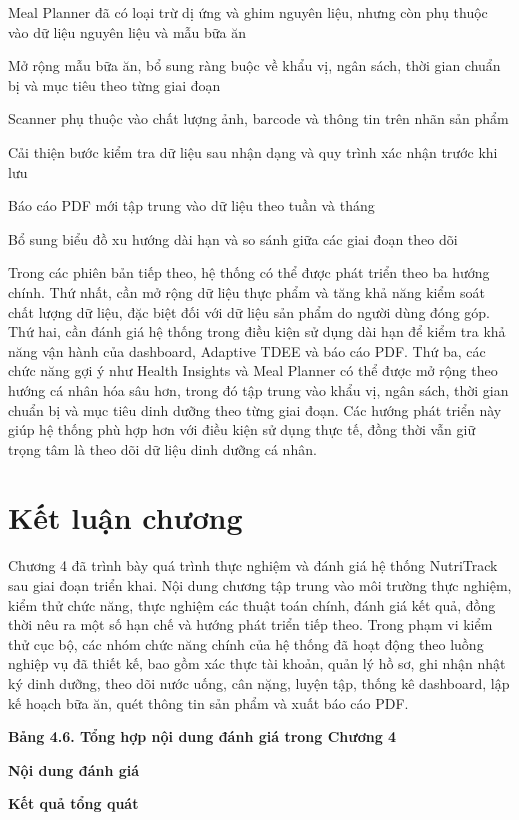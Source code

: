 \documentclass[12pt, a4paper]{report}
\begin{document}
Meal Planner đã có loại trừ dị ứng và ghim nguyên liệu, nhưng còn phụ thuộc vào dữ liệu nguyên liệu và mẫu bữa ăn

Mở rộng mẫu bữa ăn, bổ sung ràng buộc về khẩu vị, ngân sách, thời gian chuẩn bị và mục tiêu theo từng giai đoạn

Scanner phụ thuộc vào chất lượng ảnh, barcode và thông tin trên nhãn sản phẩm

Cải thiện bước kiểm tra dữ liệu sau nhận dạng và quy trình xác nhận trước khi lưu

Báo cáo PDF mới tập trung vào dữ liệu theo tuần và tháng

Bổ sung biểu đồ xu hướng dài hạn và so sánh giữa các giai đoạn theo dõi

Trong các phiên bản tiếp theo, hệ thống có thể được phát triển theo ba hướng chính. Thứ nhất, cần mở rộng dữ liệu thực phẩm và tăng khả năng kiểm soát chất lượng dữ liệu, đặc biệt đối với dữ liệu sản phẩm do người dùng đóng góp. Thứ hai, cần đánh giá hệ thống trong điều kiện sử dụng dài hạn để kiểm tra khả năng vận hành của dashboard, Adaptive TDEE và báo cáo PDF. Thứ ba, các chức năng gợi ý như Health Insights và Meal Planner có thể được mở rộng theo hướng cá nhân hóa sâu hơn, trong đó tập trung vào khẩu vị, ngân sách, thời gian chuẩn bị và mục tiêu dinh dưỡng theo từng giai đoạn. Các hướng phát triển này giúp hệ thống phù hợp hơn với điều kiện sử dụng thực tế, đồng thời vẫn giữ trọng tâm là theo dõi dữ liệu dinh dưỡng cá nhân.

\section{Kết luận chương}Chương 4 đã trình bày quá trình thực nghiệm và đánh giá hệ thống NutriTrack sau giai đoạn triển khai. Nội dung chương tập trung vào môi trường thực nghiệm, kiểm thử chức năng, thực nghiệm các thuật toán chính, đánh giá kết quả, đồng thời nêu ra một số hạn chế và hướng phát triển tiếp theo. Trong phạm vi kiểm thử cục bộ, các nhóm chức năng chính của hệ thống đã hoạt động theo luồng nghiệp vụ đã thiết kế, bao gồm xác thực tài khoản, quản lý hồ sơ, ghi nhận nhật ký dinh dưỡng, theo dõi nước uống, cân nặng, luyện tập, thống kê dashboard, lập kế hoạch bữa ăn, quét thông tin sản phẩm và xuất báo cáo PDF.

\textbf{Bảng 4.6. Tổng hợp nội dung đánh giá trong Chương 4}

\textbf{Nội dung đánh giá}

\textbf{Kết quả tổng quát}
\end{document}
